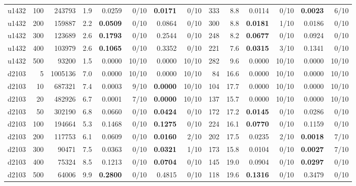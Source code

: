 \begin{tabular}{lrr@{\hskip 10pt}rrrrr@{\hskip 10pt}rrrrrr}
u1432 & 100 & 243793 & 1.9 & 0.0259 & 0/10 & \textbf{0.0171} & 0/10 & 333 & 8.8 & 0.0114 & 0/10 & \textbf{0.0023} & 6/10 \\
u1432 & 200 & 159887 & 2.2 & \textbf{0.0509} & 0/10 & 0.0864 & 0/10 & 300 & 8.8 & \textbf{0.0181} & 1/10 & 0.0186 & 0/10 \\
u1432 & 300 & 123689 & 2.6 & \textbf{0.1793} & 0/10 & 0.2544 & 0/10 & 248 & 8.2 & \textbf{0.0677} & 0/10 & 0.0924 & 0/10 \\
u1432 & 400 & 103979 & 2.6 & \textbf{0.1065} & 0/10 & 0.3352 & 0/10 & 221 & 7.6 & \textbf{0.0315} & 3/10 & 0.1341 & 0/10 \\
u1432 & 500 & 93200 & 1.5 & 0.0000 & 10/10 & 0.0000 & 10/10 & 282 & 9.6 & 0.0000 & 10/10 & 0.0000 & 10/10 \\
\addlinespace[2pt]
d2103 & 5 & 1005136 & 7.0 & 0.0000 & 10/10 & 0.0000 & 10/10 & 84 & 16.6 & 0.0000 & 10/10 & 0.0000 & 10/10 \\
d2103 & 10 & 687321 & 7.4 & 0.0003 & 9/10 & \textbf{0.0000} & 10/10 & 104 & 17.7 & 0.0000 & 10/10 & 0.0000 & 10/10 \\
d2103 & 20 & 482926 & 6.7 & 0.0001 & 7/10 & \textbf{0.0000} & 10/10 & 137 & 15.7 & 0.0000 & 10/10 & 0.0000 & 10/10 \\
d2103 & 50 & 302190 & 6.8 & 0.0660 & 0/10 & \textbf{0.0424} & 0/10 & 172 & 17.2 & \textbf{0.0145} & 0/10 & 0.0286 & 0/10 \\
d2103 & 100 & 194664 & 5.3 & 0.1468 & 0/10 & \textbf{0.1275} & 0/10 & 224 & 16.1 & \textbf{0.0770} & 0/10 & 0.1159 & 0/10 \\
d2103 & 200 & 117753 & 6.1 & 0.0609 & 0/10 & \textbf{0.0160} & 2/10 & 202 & 17.5 & 0.0235 & 2/10 & \textbf{0.0018} & 7/10 \\
d2103 & 300 & 90471 & 7.5 & 0.0363 & 0/10 & \textbf{0.0321} & 1/10 & 173 & 15.8 & 0.0104 & 0/10 & \textbf{0.0027} & 7/10 \\
d2103 & 400 & 75324 & 8.5 & 0.1213 & 0/10 & \textbf{0.0704} & 0/10 & 145 & 19.0 & 0.0904 & 0/10 & \textbf{0.0297} & 0/10 \\
d2103 & 500 & 64006 & 9.9 & \textbf{0.2800} & 0/10 & 0.4815 & 0/10 & 118 & 19.6 & \textbf{0.1316} & 0/10 & 0.3479 & 0/10 \\
\bottomrule
\end{tabular}